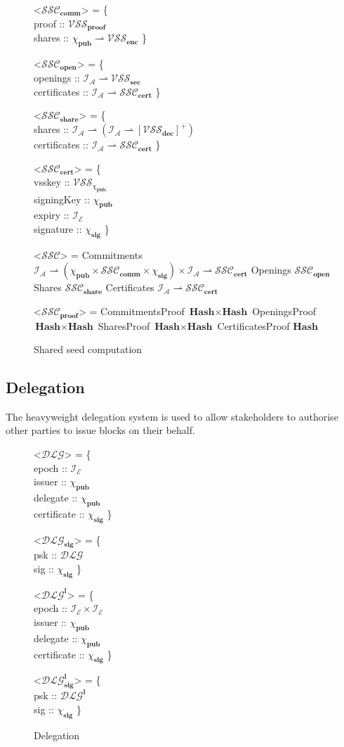 \documentclass{article}
\def\fld{\\\llap{,\quad}}%
\newcommand{\rhu}{\rightharpoonup}
\newcommand{\nelists}[1]{\left[{#1}\right]^+}
\newcommand{\idsof}[1]{\mathcal{I}\!_#1}
\newcommand{\agentids}{\idsof{\agents}}
\newcommand{\epochids}{\idsof{\mathcal{E}}}
\newcommand{\pubkey}{\chi_{\textbf{pub}}}
\newcommand{\signature}{\chi_{\textbf{sig}}}
\newcommand{\vsspubkey}{\mathcal{VSS}_{\chi_{\textbf{pub}}}}
\newcommand{\vssproof}{\mathcal{VSS}_{\textbf{proof}}}
\newcommand{\vsssec}{\mathcal{VSS}_{\textbf{sec}}}
\newcommand{\vssencshare}{\mathcal{VSS}_{\textbf{enc}}}
\newcommand{\vssdecshare}{\mathcal{VSS}_{\textbf{dec}}}
\newcommand{\agents}{\mathcal{A}}
\newcommand{\ssc}{\mathcal{SSC}}
\newcommand{\ssccomm}{\ssc_{\textbf{comm}}}
\newcommand{\sscopen}{\ssc_{\textbf{open}}}
\newcommand{\sscshare}{\ssc_{\textbf{share}}}
\newcommand{\ssccert}{\ssc_{\textbf{cert}}}
\newcommand{\sscpf}{\ssc_{\textbf{proof}}}
\newcommand{\dlg}{\mathcal{DLG}}
\newcommand{\dlglight}{\dlg^{\textbf{l}}}
\newcommand{\proxysig}{\dlg_{\textbf{sig}}}
\newcommand{\proxysiglight}{\dlg^{\textbf{l}}_{\textbf{sig}}}
\newcommand{\hstype}[1]{\textbf{#1}}
\newcommand{\hash}{\hstype{Hash}}
\begin{document}
\begin{figure}[H]
 \caption{Shared seed computation}
 \begin{grammar}
   <$\ssccomm$> = \{
   \fld proof :: $\vssproof$
   \fld shares :: $\pubkey \rhu \vssencshare$
   \}

   <$\sscopen$> = \{
   \fld openings :: $\agentids \rhu \vsssec$
   \fld certificates :: $\agentids \rhu \ssccert$
   \}

   <$\sscshare$> = \{
   \fld shares :: $\agentids \rhu (\agentids \rhu \nelists{\vssdecshare})$
   \fld certificates :: $\agentids \rhu \ssccert$
   \}

   <$\ssccert$> = \{
   \fld vsskey :: $\vsspubkey$
   \fld signingKey :: $\pubkey$
   \fld expiry :: $\epochids$
   \fld signature :: $\signature$
   \}

   <$\ssc$> = Commitments $\agentids \rhu (\pubkey \times \ssccomm \times \signature)\times \agentids \rhu \ssccert$
   \alt Openings $\sscopen$
   \alt Shares $\sscshare$
   \alt Certificates $\agentids \rhu \ssccert$

   <$\sscpf$> = CommitmentsProof $\hash \times \hash$
   \alt OpeningsProof $\hash \times \hash$
   \alt SharesProof $\hash \times \hash$
   \alt CertificatesProof $\hash$
 \end{grammar}
\end{figure}

\subsection{Delegation}

The heavyweight delegation system is used to allow stakeholders to authorise
other parties to issue blocks on their behalf.

\begin{figure}[H]
  \begin{grammar}
    <$\dlg$> = \{
    \fld epoch :: $\epochids$
    \fld issuer :: $\pubkey$
    \fld delegate :: $\pubkey$
    \fld certificate :: $\signature$
    \}

    <$\proxysig$> = \{
    \fld psk :: $\dlg$
    \fld sig :: $\signature$
    \}

    <$\dlglight$> = \{
    \fld epoch :: $\epochids\times\epochids$
    \fld issuer :: $\pubkey$
    \fld delegate :: $\pubkey$
    \fld certificate :: $\signature$
    \}

    <$\proxysiglight$> = \{
    \fld psk :: $\dlglight$
    \fld sig :: $\signature$
    \}
  \end{grammar}
  \caption{Delegation}
  \label{fig:dlgtypes}
\end{figure}
\end{document}
